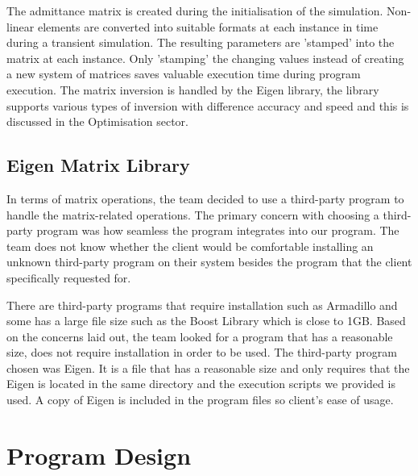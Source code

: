 \documentclass[12pt,a4paper]{article}
\begin{document}
	The admittance matrix is created during the initialisation of the simulation. Non-linear elements are converted into 
	suitable formats at each instance in time during a transient simulation. The resulting parameters are 'stamped' into the matrix
	at each instance. Only 'stamping' the changing values instead of creating a new system of matrices saves valuable execution time
	during program execution. The matrix inversion is handled by the Eigen library, the library supports various types of 
	inversion with difference accuracy and speed and this is discussed in the Optimisation sector.

	\subsection{Eigen Matrix Library}
	In terms of matrix operations, the team decided to use a third-party program to handle the matrix-related operations.
	The primary concern with choosing a third-party program was how seamless the program integrates into our program. 
	The team does not know whether the client would be comfortable installing an unknown third-party program on their system 
	besides the program that the client specifically requested for.\par
	There are third-party programs that require installation such as Armadillo and some has a large file size such as the 
	Boost Library which is close to 1GB.
	Based on the concerns laid out, the team looked for a program that has a reasonable size, does not require installation 
	in order to be used. The third-party program chosen was Eigen. It is a file that has a reasonable size and only requires that the
	Eigen is located in the same directory and the execution scripts we provided is used. A copy of Eigen is included in the program
	files so client's ease of usage.
	\pagebreak

\section{Program Design}
\end{document}
